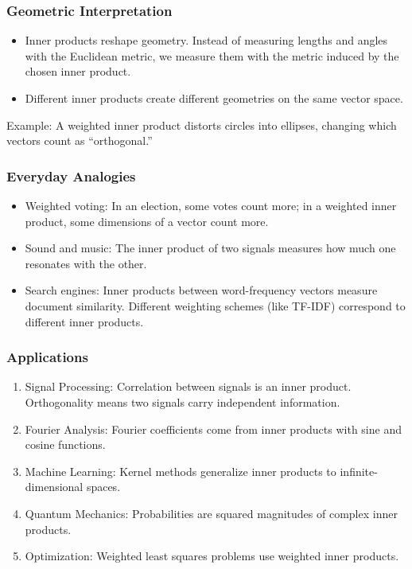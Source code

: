 \documentclass[
  letterpaper,
  DIV=11,
  numbers=noendperiod]{scrreprt}
\providecommand{\tightlist}{%
  \setlength{\itemsep}{0pt}\setlength{\parskip}{0pt}}
\begin{document}
\subsubsection{Geometric
Interpretation}\label{geometric-interpretation-15}

\begin{itemize}
\tightlist
\item
  Inner products reshape geometry. Instead of measuring lengths and
  angles with the Euclidean metric, we measure them with the metric
  induced by the chosen inner product.
\item
  Different inner products create different geometries on the same
  vector space.
\end{itemize}

Example: A weighted inner product distorts circles into ellipses,
changing which vectors count as ``orthogonal.''

\subsubsection{Everyday Analogies}\label{everyday-analogies-67}

\begin{itemize}
\tightlist
\item
  Weighted voting: In an election, some votes count more; in a weighted
  inner product, some dimensions of a vector count more.
\item
  Sound and music: The inner product of two signals measures how much
  one resonates with the other.
\item
  Search engines: Inner products between word-frequency vectors measure
  document similarity. Different weighting schemes (like TF-IDF)
  correspond to different inner products.
\end{itemize}

\subsubsection{Applications}\label{applications-33}

\begin{enumerate}
\def\labelenumi{\arabic{enumi}.}
\tightlist
\item
  Signal Processing: Correlation between signals is an inner product.
  Orthogonality means two signals carry independent information.
\item
  Fourier Analysis: Fourier coefficients come from inner products with
  sine and cosine functions.
\item
  Machine Learning: Kernel methods generalize inner products to
  infinite-dimensional spaces.
\item
  Quantum Mechanics: Probabilities are squared magnitudes of complex
  inner products.
\item
  Optimization: Weighted least squares problems use weighted inner
  products.
\end{enumerate}
\end{document}
